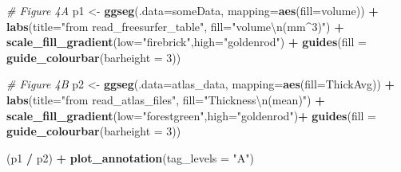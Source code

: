 \documentclass[fleqn,10pt]{wlpeerj} %
\newenvironment{Shaded}{\begin{snugshade}}{\end{snugshade}}
\newcommand{\CharTok}[1]{\textcolor[rgb]{0.31,0.60,0.02}{#1}}
\newcommand{\CommentTok}[1]{\textcolor[rgb]{0.56,0.35,0.01}{\textit{#1}}}
\newcommand{\DataTypeTok}[1]{\textcolor[rgb]{0.13,0.29,0.53}{#1}}
\newcommand{\DecValTok}[1]{\textcolor[rgb]{0.00,0.00,0.81}{#1}}
\newcommand{\KeywordTok}[1]{\textcolor[rgb]{0.13,0.29,0.53}{\textbf{#1}}}
\newcommand{\NormalTok}[1]{#1}
\newcommand{\OperatorTok}[1]{\textcolor[rgb]{0.81,0.36,0.00}{\textbf{#1}}}
\newcommand{\StringTok}[1]{\textcolor[rgb]{0.31,0.60,0.02}{#1}}
\begin{document}
\begin{Shaded}
\begin{Highlighting}[]

\CommentTok{\# Figure 4A}
\NormalTok{p1 <{-}}\StringTok{ }\KeywordTok{ggseg}\NormalTok{(}\DataTypeTok{.data=}\NormalTok{someData, }\DataTypeTok{mapping=}\KeywordTok{aes}\NormalTok{(}\DataTypeTok{fill=}\NormalTok{volume))  }\OperatorTok{+}
\StringTok{  }\KeywordTok{labs}\NormalTok{(}\DataTypeTok{title=}\StringTok{"from read\_freesurfer\_table"}\NormalTok{, }
       \DataTypeTok{fill=}\StringTok{"volume}\CharTok{\textbackslash{}n}\StringTok{(mm\^{}3)"}\NormalTok{) }\OperatorTok{+}
\StringTok{  }\KeywordTok{scale\_fill\_gradient}\NormalTok{(}\DataTypeTok{low=}\StringTok{"firebrick"}\NormalTok{,}\DataTypeTok{high=}\StringTok{"goldenrod"}\NormalTok{) }\OperatorTok{+}
\StringTok{  }\KeywordTok{guides}\NormalTok{(}\DataTypeTok{fill =} \KeywordTok{guide\_colourbar}\NormalTok{(}\DataTypeTok{barheight =} \DecValTok{3}\NormalTok{))}

\CommentTok{\# Figure 4B}
\NormalTok{p2 <{-}}\StringTok{ }\KeywordTok{ggseg}\NormalTok{(}\DataTypeTok{.data=}\NormalTok{atlas\_data, }\DataTypeTok{mapping=}\KeywordTok{aes}\NormalTok{(}\DataTypeTok{fill=}\NormalTok{ThickAvg))  }\OperatorTok{+}
\StringTok{  }\KeywordTok{labs}\NormalTok{(}\DataTypeTok{title=}\StringTok{"from read\_atlas\_files"}\NormalTok{, }
       \DataTypeTok{fill=}\StringTok{"Thickness}\CharTok{\textbackslash{}n}\StringTok{(mean)"}\NormalTok{) }\OperatorTok{+}
\StringTok{  }\KeywordTok{scale\_fill\_gradient}\NormalTok{(}\DataTypeTok{low=}\StringTok{"forestgreen"}\NormalTok{,}\DataTypeTok{high=}\StringTok{"goldenrod"}\NormalTok{)}\OperatorTok{+}
\StringTok{  }\KeywordTok{guides}\NormalTok{(}\DataTypeTok{fill =} \KeywordTok{guide\_colourbar}\NormalTok{(}\DataTypeTok{barheight =} \DecValTok{3}\NormalTok{))}

\NormalTok{(p1 }\OperatorTok{/}\StringTok{ }\NormalTok{p2) }\OperatorTok{+}
\StringTok{  }\KeywordTok{plot\_annotation}\NormalTok{(}\DataTypeTok{tag\_levels =} \StringTok{"A"}\NormalTok{)}
\end{Highlighting}
\end{Shaded}
\end{document}
